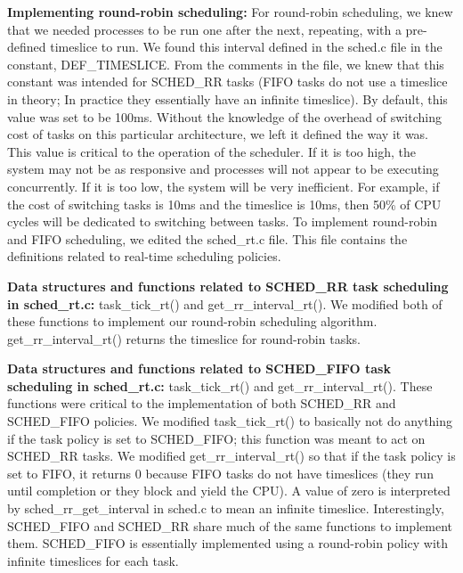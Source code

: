\documentclass[letterpaper,10pt,titlepage]{article}
\newcommand{\ignore}[2]{\hspace{0in}#2} %
\newcommand{\tab}{\hspace*{2em}} %
\begin{document}
\begin{enumerate}
\tab \textbf{Implementing round-robin scheduling:} For round-robin scheduling, we knew that we needed processes to be run one after the next, repeating, with a pre-defined timeslice to run. We found this interval defined in the sched.c file in the constant, DEF\_TIMESLICE. From the comments in the file, we knew that this constant was intended for SCHED\_RR tasks (FIFO tasks do not use a timeslice in theory; In practice they essentially have an infinite timeslice). By default, this value was set to be 100ms. Without the knowledge of the overhead of switching cost of tasks on this particular architecture, we left it defined the way it was. This value is critical to the operation of the scheduler. If it is too high, the system may not be as responsive and processes will not appear to be executing concurrently. If it is too low, the system will be very inefficient. For example, if the cost of switching tasks is 10ms and the timeslice is 10ms, then 50\% of CPU cycles will be dedicated to switching between tasks. \ignore{[http://oreilly.com/catalog/linuxkernel/chapter/ch10.html]}

\tab To implement round-robin and FIFO scheduling, we edited the sched\_rt.c file. This file contains the definitions related to real-time scheduling policies.

\tab \textbf{Data structures and functions related to SCHED\_RR task scheduling in sched\_rt.c:} task\_tick\_rt() and get\_rr\_interval\_rt(). We modified both of these functions to implement our round-robin scheduling algorithm. get\_rr\_interval\_rt() returns the timeslice for round-robin tasks.
 
\tab \textbf{Data structures and functions related to SCHED\_FIFO task scheduling in sched\_rt.c:} task\_tick\_rt() and get\_rr\_interval\_rt(). These functions were critical to the implementation of both SCHED\_RR and SCHED\_FIFO policies. We modified task\_tick\_rt() to basically not do anything if the task policy is set to SCHED\_FIFO; this function was meant to act on SCHED\_RR tasks. We modified get\_rr\_interval\_rt() so that if the task policy is set to FIFO, it returns 0 because FIFO tasks do not have timeslices (they run until completion or they block and yield the CPU). A value of zero is interpreted by sched\_rr\_get\_interval in sched.c to mean an infinite timeslice. Interestingly, SCHED\_FIFO and SCHED\_RR share much of the same functions to implement them. SCHED\_FIFO is essentially implemented using a round-robin policy with infinite timeslices for each task.


\end{enumerate}
\end{document}
